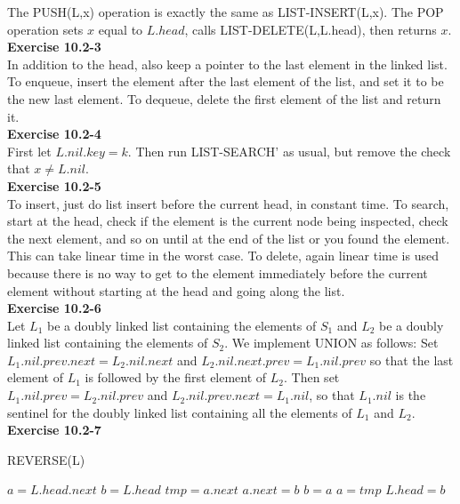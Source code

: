 \documentclass{article}
\begin{document}
The PUSH(L,x) operation is exactly the same as LIST-INSERT(L,x).  The POP operation sets $x$ equal to $L.head$, calls LIST-DELETE(L,L.head), then returns $x$. \\


\noindent\textbf{ Exercise 10.2-3} \\

In addition to the head, also keep a pointer to the last element in the linked list. To enqueue, insert the element after the last element of the list, and set it to be the new last element. To dequeue, delete the first element of the list and return it.\\

\noindent\textbf{Exercise 10.2-4}\\

First let $L.nil.key = k$.  Then run LIST-SEARCH' as usual, but remove the check that $x \neq L.nil$. \\

\noindent\textbf{ Exercise 10.2-5} \\

To insert, just do list insert before the current head, in constant time. To search, start at the head, check if the element is the current node being inspected, check the next element, and so on until at the end of the list or you found the element. This can take linear time in the worst case. To delete, again linear time is used because there is no way to get to the element immediately before the current element without starting at the head and going along the list.\\

\noindent\textbf{Exercise 10.2-6}\\

Let $L_1$ be a doubly linked list containing the elements of $S_1$ and $L_2$ be a doubly linked list containing the elements of $S_2$.  We implement UNION as follows: Set $L_1.nil.prev.next = L_2.nil.next$ and $L_2.nil.next.prev = L_1.nil.prev$ so that the last element of $L_1$ is followed by the first element of $L_2$.  Then set $L_1.nil.prev = L_2.nil.prev$ and $L_2.nil.prev.next = L_1.nil$, so that $L_1.nil$ is the sentinel for the doubly linked list containing all the elements of $L_1$ and $L_2$. \\

\noindent\textbf{ Exercise 10.2-7} \\

\begin{algorithm}
\caption{REVERSE(L)}
\begin{algorithmic}
\State $a = L.head.next$
\State $b = L.head$
\State $tmp = a.next$
\State $a.next = b$
\State $b = a$
\State $a= tmp$
\EndWhile
\State $L.head  = b$
\end{algorithmic}
\end{algorithm}
\end{document}
